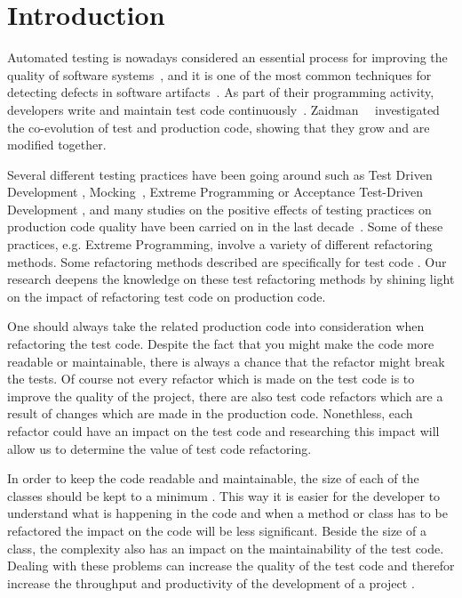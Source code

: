 
\section{Introduction}
Automated testing is nowadays considered an essential process for 
improving the quality of software systems~\cite{Bertolino2007,Myers2004}, and it is
one of the most common techniques for detecting defects in 
software artifacts~\cite{laitenberger1998studying,van2001refactoring}.
As part of their programming activity, developers write and maintain test code 
continuously~\cite{van2001refactoring}. Zaidman~\etal~\cite{Zaidman2008} investigated the
co-evolution of test and production code, showing that they grow and are modified together.

Several different testing
practices have been going around such as Test Driven Development
\cite{erdogmus2010test}, Mocking~\cite{Spadini}, Extreme Programming \cite{lindstrom2004extreme} or
Acceptance Test-Driven Development \cite{aggarwal2014acceptance}, and many studies on the 
positive effects of testing practices on production code quality have
been carried on in the last decade~\cite{laitenberger1998studying,binder1996testing}. 
Some of these practices,
e.g. Extreme Programming, involve a variety of different refactoring methods.
Some refactoring methods described are specifically for test code
\cite{van2001refactoring}. Our research deepens the knowledge on these test
refactoring methods by shining light on the impact of refactoring test code on
production code.

One should always take the related production code into consideration when
refactoring the test code. Despite the fact that you might make the code more
readable or maintainable, there is always a chance that the refactor might break
the tests. Of course not every refactor which is made on the test code is to
improve the quality of the project, there are also test code refactors which are
a result of changes which are made in the production code. Nonethless, each
refactor could have an impact on the test code and researching this impact will
allow us to determine the value of test code refactoring.

In order to keep the code readable and maintainable, the size of each of the
classes should be kept to a minimum \cite{baggen2012standardized}. This way it
is easier for the developer to understand what is happening in the code and when
a method or class has to be refactored the impact on the code will be less
significant. Beside the size of a class, the complexity also has an impact on
the maintainability of the test code. Dealing with these problems can increase
the quality of the test code and therefor increase the throughput and
productivity of the development of a project \cite{athanasiou2011constructing}.

